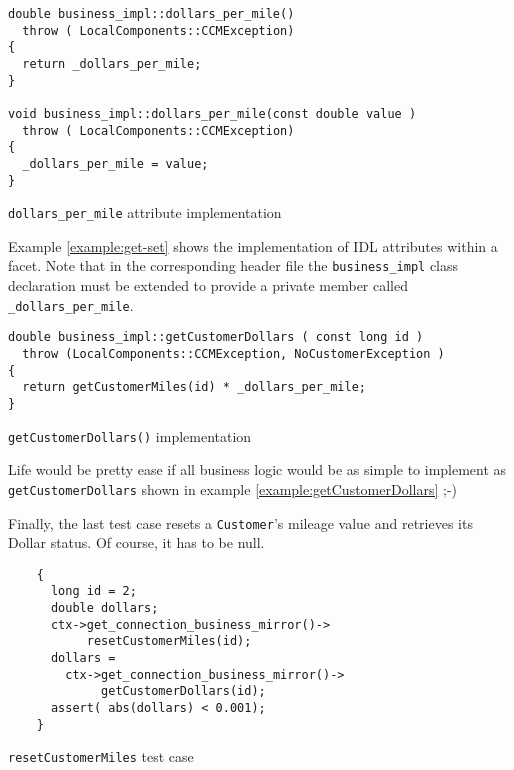 \begin{Example}
\begin{minifbox}
\begin{small}
\begin{verbatim}
double business_impl::dollars_per_mile()
  throw ( LocalComponents::CCMException)
{
  return _dollars_per_mile;
}

void business_impl::dollars_per_mile(const double value )
  throw ( LocalComponents::CCMException)
{
  _dollars_per_mile = value;
}
\end{verbatim}
\end{small}
\end{minifbox}
\caption{{\tt dollars\_per\_mile} attribute implementation}
\label{example:get-set}
\end{Example}

Example \ref{example:get-set} shows the implementation of IDL attributes within 
a facet.
Note that in the corresponding header file the {\tt business\_impl} class 
declaration must be extended to provide a private member called 
{\tt \_dollars\_per\_mile}. 

\begin{Example}
\begin{minifbox}
\begin{small}
\begin{verbatim}
double business_impl::getCustomerDollars ( const long id )
  throw (LocalComponents::CCMException, NoCustomerException )
{
  return getCustomerMiles(id) * _dollars_per_mile;
}
\end{verbatim}
\end{small}
\end{minifbox}
\caption{{\tt getCustomerDollars()} implementation}
\label{example:getCustomerDollars}
\end{Example}

Life would be pretty ease if all business logic would be as simple to implement 
as \\ 
{\tt getCustomerDollars} shown in example \ref{example:getCustomerDollars} 
;-)


Finally, the last test case resets a {\tt Customer}'s mileage value and 
retrieves its Dollar status. Of course, it has to be null.

\begin{Example}
\begin{minifbox}
\begin{small}
\begin{verbatim}
    {
      long id = 2;
      double dollars;
      ctx->get_connection_business_mirror()->
           resetCustomerMiles(id);
      dollars = 
        ctx->get_connection_business_mirror()->
             getCustomerDollars(id); 
      assert( abs(dollars) < 0.001);
    }
\end{verbatim}
\end{small}
\end{minifbox}
\caption{{\tt resetCustomerMiles} test case}
\label{example:}
\end{Example}




